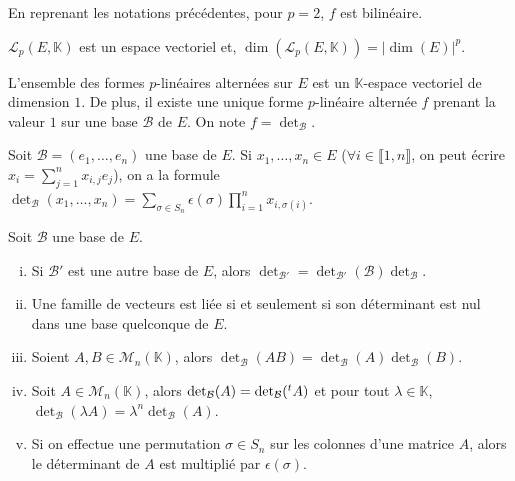 	\begin{example}
		En reprenant les notations précédentes, pour $p = 2$, $f$ est bilinéaire.
	\end{example}
	
	\begin{proposition}
		$\mathcal{L}_p(E, \mathbb{K})$ est un espace vectoriel et, $\operatorname{dim}(\mathcal{L}_p(E, \mathbb{K})) = |\operatorname{dim}(E)|^p$.
	\end{proposition}
	
	\begin{theorem}
		L'ensemble des formes $p$-linéaires alternées sur $E$ est un $\mathbb{K}$-espace vectoriel de dimension $1$. De plus, il existe une unique forme $p$-linéaire alternée $f$ prenant la valeur $1$ sur une base $\mathcal{B}$ de $E$. On note $f = \det_{\mathcal{B}}$.
	\end{theorem}
	
	\begin{proposition}
		Soit $\mathcal{B} = (e_1, \dots, e_n)$ une base de $E$. Si $x_1, \dots, x_n \in E$ ($\forall i \in \llbracket 1, n \rrbracket$, on peut écrire $x_i = \sum_{j=1}^n x_{i,j} e_j$), on a la formule $\det_{\mathcal{B}}(x_1, \dots, x_n) = \sum_{\sigma \in S_n} \epsilon(\sigma) \prod_{i=1}^n x_{i,\sigma(i)}$.
	\end{proposition}
	
	\begin{corollary}
		Soit $\mathcal{B}$ une base de $E$.
		\begin{enumerate}[(i)]
			\item Si $\mathcal{B}'$ est une autre base de $E$, alors $\det_{\mathcal{B}'} = \det_{\mathcal{B}'}(\mathcal{B}) \det_{\mathcal{B}}$.
			\item Une famille de vecteurs est liée si et seulement si son déterminant est nul dans une base quelconque de $E$.
			\item Soient $A, B \in \mathcal{M}_n(\mathbb{K})$, alors $\det_{\mathcal{B}}(AB) = \det_{\mathcal{B}}(A) \det_{\mathcal{B}}(B)$.
			\item Soit $A \in \mathcal{M}_n(\mathbb{K})$, alors $\det_{\mathcal{B}}(A) = \det_{\mathcal{B}}(\mathstrut ^t A)$ et pour tout $\lambda \in \mathbb{K}$, $\det_{\mathcal{B}}(\lambda A) = \lambda^n \det_{\mathcal{B}}(A)$.
			\item Si on effectue une permutation $\sigma \in S_n$ sur les colonnes d'une matrice $A$, alors le déterminant de $A$ est multiplié par $\epsilon(\sigma)$.
		\end{enumerate}
	\end{corollary}
	
